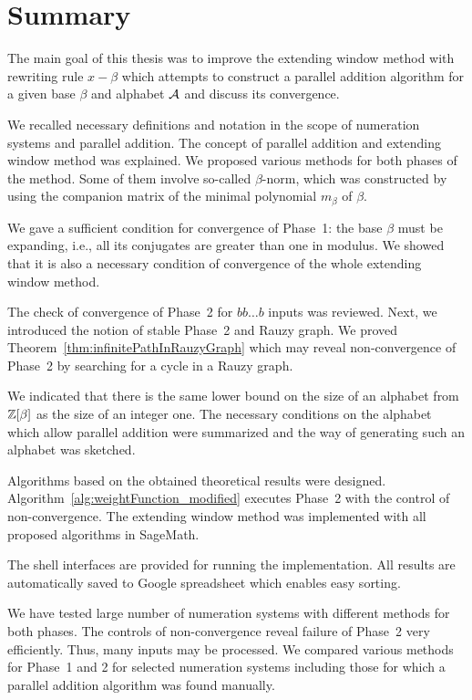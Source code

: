 \chapter*{Summary}
The main goal of this thesis was to improve the extending window method with rewriting rule $x-\beta$ which attempts to construct a parallel addition algorithm for a given base $\beta$ and alphabet $\mathcal{A}$ and discuss its convergence.

We  recalled necessary definitions and notation in the scope of numeration systems and parallel addition. The concept of parallel addition and extending  window method was explained. We proposed various methods for both phases of the method. Some of them involve so-called $\beta$-norm, which was constructed by using the companion matrix of the minimal polynomial $m_\beta$ of $\beta$.

We gave a sufficient condition for convergence of Phase~1: the base $\beta$ must be expanding, i.e., all its conjugates are greater than one in modulus. We showed that it is also a necessary condition of convergence of the whole extending window method. 

The check of convergence of Phase~2 for $bb\dots b$ inputs was reviewed. Next, we introduced the notion of stable Phase~2 and  Rauzy graph. We proved Theorem~\ref{thm:infinitePathInRauzyGraph} which may reveal non-convergence of Phase~2 by searching for a cycle in a Rauzy graph.

We indicated that there is the same lower bound on the size of an alphabet from $\mathbb{Z}[\beta]$ as the size of an integer one. The necessary conditions on the alphabet which allow parallel addition were summarized and the way of generating such an alphabet was sketched.

Algorithms based on the obtained theoretical results were designed. Algorithm~\ref{alg:weightFunction_modified} executes Phase~2 with the control of non-convergence. The extending window method was implemented with all proposed algorithms in SageMath.

The shell interfaces are provided for running the implementation. All results are automatically saved to Google spreadsheet which enables easy sorting.

We have tested large number of numeration systems with different methods for both phases. The controls of non-convergence reveal failure of Phase~2 very efficiently. Thus, many inputs may be processed. We compared various methods for Phase~1 and 2 for selected numeration systems including those for which a parallel addition algorithm was found manually.

